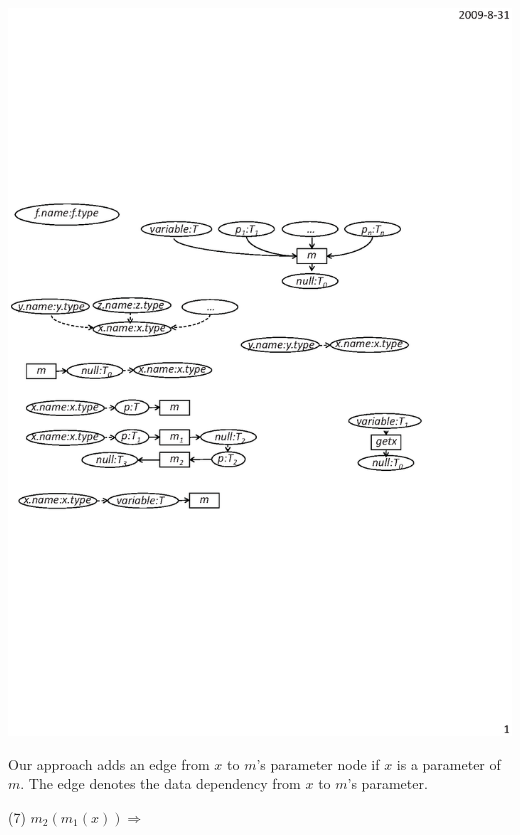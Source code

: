 \begin{center}
\includegraphics[scale=0.7,clip]{figure/rule6.eps}%
\end{center}

Our approach adds an edge from $x$ to $m$'s parameter node if $x$ is
a parameter of $m$. The edge denotes the data dependency from $x$ to
$m$'s parameter.

(7) $m_2(m_1(x))\Rightarrow$

